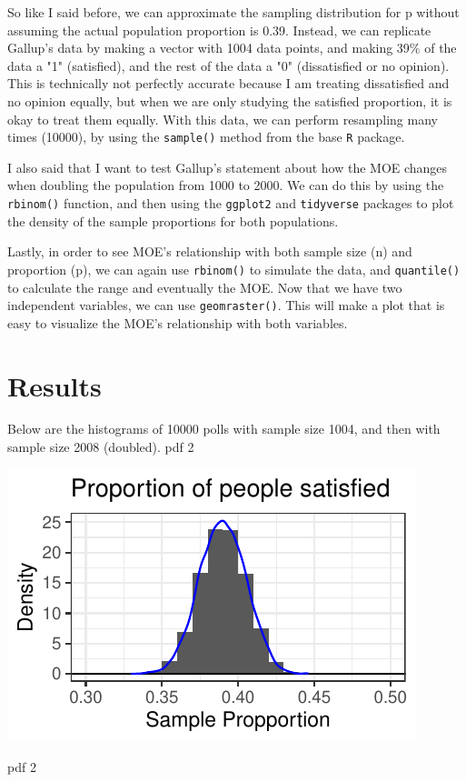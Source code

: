 \documentclass{article}\usepackage[]{graphicx}\usepackage[]{xcolor}
\newenvironment{Figure}
  {\par\medskip\noindent\minipage{\linewidth}}
  {\endminipage\par\medskip}
\begin{document}
\begin{multicols}{2}
So like I said before, we can approximate the sampling distribution for p without assuming the actual population proportion is 0.39. Instead, we can replicate Gallup's data by making a vector with 1004 data points, and making 39\% of the data a "1" (satisfied), and the rest of the data a "0" (dissatisfied or no opinion). This is technically not perfectly accurate because I am treating dissatisfied and no opinion equally, but when we are only studying the satisfied proportion, it is okay to treat them equally. With this data, we can perform resampling many times (10000), by using the \texttt{sample()} method from the base \texttt{R} package.

I also said that I want to test Gallup's statement about how the MOE changes when doubling the population from 1000 to 2000. We can do this by using the \texttt{rbinom()} function, and then using the \texttt{ggplot2} \citep{ggplot2} and \texttt{tidyverse} \citep{tidyverse} packages to plot the density of the sample proportions for both populations.

Lastly, in order to see MOE's relationship with both sample size (n) and proportion (p), we can again use \texttt{rbinom()} to simulate the data, and \texttt{quantile()} to calculate the range and eventually the MOE. Now that we have two independent variables, we can use \texttt{geom\textunderscore raster()}. This will make a plot that is easy to visualize the MOE's relationship with both variables.
\section{Results}
Below are the histograms of 10000 polls with sample size 1004, and then with sample size 2008 (doubled).
pdf 
  2 

\begin{Figure}
\includegraphics{Histogram1.pdf}
 \label{fig:histogram1}
\end{Figure}
pdf 
  2 


\end{multicols}
\end{document}
